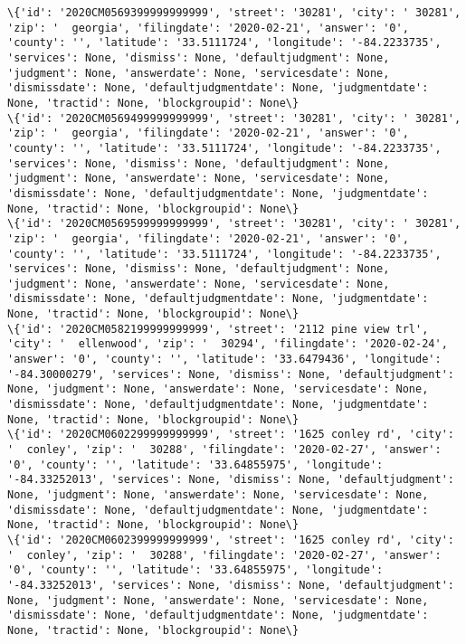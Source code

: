 \documentclass[11pt]{article}
\begin{document}
\begin{Verbatim}[commandchars=\\\{\}]
\{'id': '2020CM0569399999999999', 'street': '30281', 'city': ' 30281', 'zip': '  georgia', 'filingdate': '2020-02-21', 'answer': '0', 'county': '', 'latitude': '33.5111724', 'longitude': '-84.2233735', 'services': None, 'dismiss': None, 'defaultjudgment': None, 'judgment': None, 'answerdate': None, 'servicesdate': None, 'dismissdate': None, 'defaultjudgmentdate': None, 'judgmentdate': None, 'tractid': None, 'blockgroupid': None\}
\{'id': '2020CM0569499999999999', 'street': '30281', 'city': ' 30281', 'zip': '  georgia', 'filingdate': '2020-02-21', 'answer': '0', 'county': '', 'latitude': '33.5111724', 'longitude': '-84.2233735', 'services': None, 'dismiss': None, 'defaultjudgment': None, 'judgment': None, 'answerdate': None, 'servicesdate': None, 'dismissdate': None, 'defaultjudgmentdate': None, 'judgmentdate': None, 'tractid': None, 'blockgroupid': None\}
\{'id': '2020CM0569599999999999', 'street': '30281', 'city': ' 30281', 'zip': '  georgia', 'filingdate': '2020-02-21', 'answer': '0', 'county': '', 'latitude': '33.5111724', 'longitude': '-84.2233735', 'services': None, 'dismiss': None, 'defaultjudgment': None, 'judgment': None, 'answerdate': None, 'servicesdate': None, 'dismissdate': None, 'defaultjudgmentdate': None, 'judgmentdate': None, 'tractid': None, 'blockgroupid': None\}
\{'id': '2020CM0582199999999999', 'street': '2112 pine view trl', 'city': '  ellenwood', 'zip': '  30294', 'filingdate': '2020-02-24', 'answer': '0', 'county': '', 'latitude': '33.6479436', 'longitude': '-84.30000279', 'services': None, 'dismiss': None, 'defaultjudgment': None, 'judgment': None, 'answerdate': None, 'servicesdate': None, 'dismissdate': None, 'defaultjudgmentdate': None, 'judgmentdate': None, 'tractid': None, 'blockgroupid': None\}
\{'id': '2020CM0602299999999999', 'street': '1625 conley rd', 'city': '  conley', 'zip': '  30288', 'filingdate': '2020-02-27', 'answer': '0', 'county': '', 'latitude': '33.64855975', 'longitude': '-84.33252013', 'services': None, 'dismiss': None, 'defaultjudgment': None, 'judgment': None, 'answerdate': None, 'servicesdate': None, 'dismissdate': None, 'defaultjudgmentdate': None, 'judgmentdate': None, 'tractid': None, 'blockgroupid': None\}
\{'id': '2020CM0602399999999999', 'street': '1625 conley rd', 'city': '  conley', 'zip': '  30288', 'filingdate': '2020-02-27', 'answer': '0', 'county': '', 'latitude': '33.64855975', 'longitude': '-84.33252013', 'services': None, 'dismiss': None, 'defaultjudgment': None, 'judgment': None, 'answerdate': None, 'servicesdate': None, 'dismissdate': None, 'defaultjudgmentdate': None, 'judgmentdate': None, 'tractid': None, 'blockgroupid': None\}

\end{Verbatim}
\end{document}
